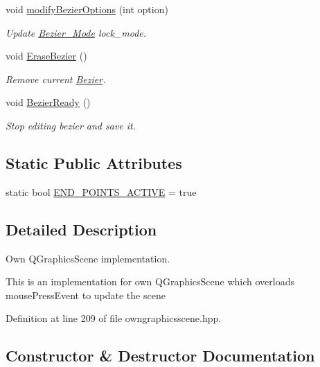 \begin{DoxyCompactItemize}
void \mbox{\hyperlink{classOwnGraphicsScene_a302a5f437c44f6fc84f9911e41172734}{modify\+Bezier\+Options}} (int option)
\begin{DoxyCompactList}\small\item\em Update \mbox{\hyperlink{structBezier__Mode}{Bezier\+\_\+\+Mode}} lock\+\_\+mode. \end{DoxyCompactList}\item 
void \mbox{\hyperlink{classOwnGraphicsScene_a7b205ba3c4db5e88f60f1f327175b5b6}{Erase\+Bezier}} ()
\begin{DoxyCompactList}\small\item\em Remove current \mbox{\hyperlink{classBezier}{Bezier}}. \end{DoxyCompactList}\item 
void \mbox{\hyperlink{classOwnGraphicsScene_a0417f4637137fc3ef7004a7b6eeb6a39}{Bezier\+Ready}} ()
\begin{DoxyCompactList}\small\item\em Stop editing bezier and save it. \end{DoxyCompactList}\end{DoxyCompactItemize}
\subsection*{Static Public Attributes}
\begin{DoxyCompactItemize}
\item 
static bool \mbox{\hyperlink{classOwnGraphicsScene_a511dd73ffc0a5f3ee28e8950d0636f5e}{E\+N\+D\+\_\+\+P\+O\+I\+N\+T\+S\+\_\+\+A\+C\+T\+I\+VE}} = true
\end{DoxyCompactItemize}


\subsection{Detailed Description}
Own Q\+Graphics\+Scene implementation. 

This is an implementation for own Q\+Graphics\+Scene which overloads mouse\+Press\+Event to update the scene 

Definition at line 209 of file owngraphicsscene.\+hpp.



\subsection{Constructor \& Destructor Documentation}
\mbox{\label{classOwnGraphicsScene_a242b82147a469314e4c7fb5af69c265f}} 
